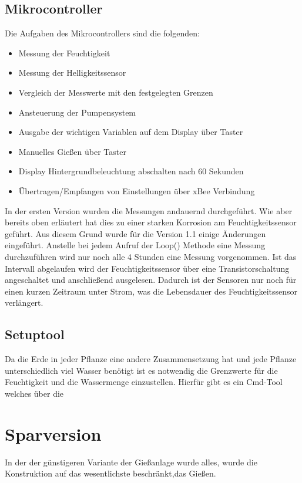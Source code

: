 \documentclass[]{IEEEtran}
\begin{document}
	\subsection{Mikrocontroller}
	Die Aufgaben des Mikrocontrollers sind die folgenden:
		\begin{itemize}
			\item Messung der Feuchtigkeit
			\item Messung der Helligkeitssensor
			\item Vergleich der Messwerte mit den festgelegten Grenzen
			\item Ansteuerung der Pumpensystem
			\item Ausgabe der wichtigen Variablen auf dem Display über Taster
			\item Manuelles Gießen über Taster
			\item Display Hintergrundbeleuchtung abschalten nach 60  Sekunden
			\item Übertragen/Empfangen von Einstellungen über xBee Verbindung
		\end{itemize}
		
	In der ersten Version wurden die Messungen andauernd durchgeführt. Wie aber bereits oben erläutert hat dies zu einer starken Korrosion am Feuchtigkeitssensor geführt. Aus diesem Grund wurde für die Version 1.1 einige Änderungen eingeführt. Anstelle bei jedem Aufruf der Loop() Methode eine Messung durchzuführen wird nur noch alle 4 Stunden eine Messung vorgenommen. Ist das Intervall abgelaufen wird der Feuchtigkeitssensor über eine Transistorschaltung angeschaltet und anschließend ausgelesen. Dadurch ist der Sensoren nur noch für einen kurzen Zeitraum unter Strom, was die Lebensdauer des Feuchtigkeitssensor verlängert.
		
	
	\subsection{Setuptool}
	Da die Erde in jeder Pflanze eine andere Zusammensetzung hat und jede Pflanze unterschiedlich viel Wasser benötigt ist es notwendig die Grenzwerte für die Feuchtigkeit und die Wassermenge einzustellen. Hierfür gibt es ein Cmd-Tool welches über die 
	
			\section{Sparversion}
	In der der günstigeren Variante der Gießanlage wurde alles, wurde die Konstruktion auf das wesentlichste beschränkt,das Gießen.
\end{document}
